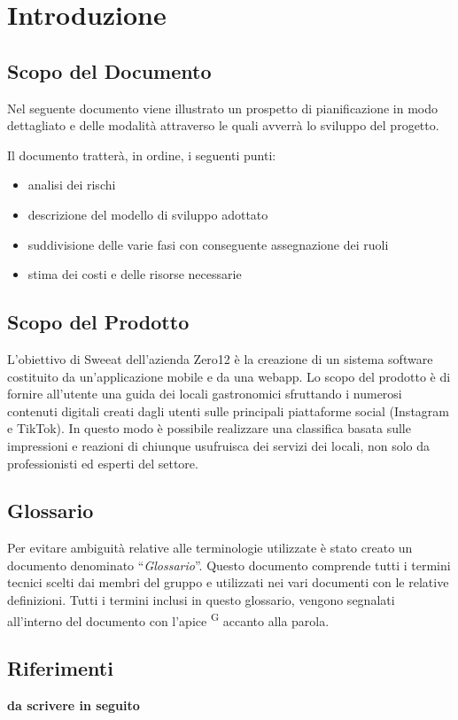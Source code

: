 \section{Introduzione}

\subsection{Scopo del Documento}
Nel seguente documento viene illustrato un prospetto di pianificazione in modo dettagliato e delle modalità attraverso le quali avverrà lo sviluppo del progetto. 

Il documento tratterà,  in ordine,  i seguenti punti:
\begin{itemize}
\item analisi dei rischi
\item descrizione del modello di sviluppo adottato
\item suddivisione delle varie fasi con conseguente assegnazione dei ruoli
\item stima dei costi e delle risorse necessarie
\end{itemize}

\subsection{Scopo del Prodotto}

L’obiettivo di Sweeat dell’azienda Zero12 è la creazione di un sistema software costituito da un’applicazione mobile e da una webapp. Lo scopo del prodotto è di fornire all’utente una guida dei locali gastronomici sfruttando i numerosi contenuti digitali creati dagli utenti sulle principali piattaforme social (Instagram e TikTok). In questo modo è possibile realizzare una classifica basata sulle impressioni e reazioni di chiunque usufruisca dei servizi dei locali, non solo da professionisti ed esperti del settore.

\subsection{Glossario}

Per evitare ambiguità relative alle terminologie utilizzate è stato creato un documento denominato “\textit{Glossario}”. Questo documento comprende tutti i termini tecnici scelti dai membri del gruppo e utilizzati nei vari documenti con le relative definizioni. Tutti i termini inclusi in questo glossario, vengono segnalati all’interno del documento con l’apice \textsuperscript{G} accanto alla parola.

\subsection{Riferimenti}
\textbf{da scrivere in seguito}



